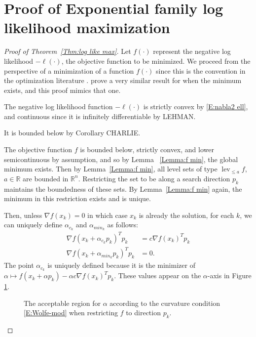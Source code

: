 \documentclass[oneside]{myumnStatThesis}
\DeclareMathOperator{\lev}{lev}
\def\RR{{\mathbb R}}
\begin{document}
\section{Proof of Exponential family log likelihood maximization}
\begin{proof}[Proof of Theorem~\ref{Thm:log like max}]
Let $f(\cdot)$ represent the negative log likelihood $- \ell(\cdot)$, the objective function to be minimized.  We proceed from the perspective of a minimization of a function $f(\cdot)$ since this is the convention in the optimization literature \citep{NW}.  \citet{Okabayashi:longrange} prove a very similar result for when the minimum exists, and this proof mimics that one.

The negative log likelihood function $-\ell(\cdot)$ is strictly convex by \eqref{E:nabla2 ell}, and continuous since it is infinitely differentiable by LEHMAN.

It is bounded below by Corollary CHARLIE.

The objective function $f$ is bounded below, strictly convex, and lower semicontinuous by assumption, and so by Lemma~
\ref{Lemma:f min}, the global minimum exists.  
Then by Lemma~\ref{Lemma:f min}, all level sets of type $\lev_{\leq a} f
$, $a \in \RR$ are bounded in $\RR^n$.  Restricting the set to be along a search direction $p_k$ maintains the 
boundedness of these sets.  By Lemma~\ref{Lemma:f min} again, the minimum in this restriction exists and is unique.     

Then, unless $\nabla f( x_k ) = 0$ in which case $x_k$ is already the solution, for each $k$, we can uniquely define $
\alpha_{c_k}$ and $\alpha_{min_k}$ as follows: 
\begin{align}
	\nabla f( x_k + \alpha_{c_k} p_k)^T p_k &= c \nabla f(x_k)^T p_k \label{E:alphac} \\
	\nabla f( x_k + \alpha_{min_k} p_k)^T p_k &= 0. \label{E:alphamin} 
\end{align}
The point $\alpha_{c_k}$ is uniquely defined because it is the minimizer of $\alpha \mapsto f( x_k + \alpha p_k) - 
\alpha c \nabla f( x_k )^T p_k$.
These values appear on the $\alpha$-axis in Figure \ref{F:Wolfe-mod}.
\begin{figure}
\centering
\scalebox{.4}{}
\caption{The acceptable region for $\alpha$ according to the curvature condition \eqref{E:Wolfe-mod} when restricting 
$f$ to direction $p_k$.}
\label{F:Wolfe-mod}
\end{figure}


\end{proof}
\end{document}

